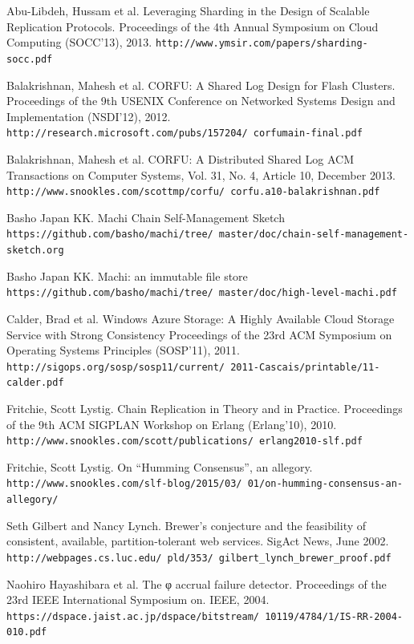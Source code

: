 \documentclass[preprint,10pt]{sigplanconf}
\begin{document}

\begin{thebibliography}{}
\softraggedright

Abu-Libdeh, Hussam et al.
Leveraging Sharding in the Design of Scalable Replication Protocols.
Proceedings of the 4th Annual Symposium on Cloud Computing (SOCC'13), 2013.
{\tt http://www.ymsir.com/papers/sharding-socc.pdf}

Balakrishnan, Mahesh et al.
CORFU: A Shared Log Design for Flash Clusters.
Proceedings of the 9th USENIX Conference on Networked Systems Design
and Implementation (NSDI'12), 2012.
{\tt http://research.microsoft.com/pubs/157204/ corfumain-final.pdf}

Balakrishnan, Mahesh et al.
CORFU: A Distributed Shared Log
ACM Transactions on Computer Systems, Vol. 31, No. 4, Article 10, December 2013.
{\tt http://www.snookles.com/scottmp/corfu/ corfu.a10-balakrishnan.pdf}

Basho Japan KK.
Machi Chain Self-Management Sketch
{\tt https://github.com/basho/machi/tree/ master/doc/chain-self-management-sketch.org}

Basho Japan KK.
Machi: an immutable file store
{\tt https://github.com/basho/machi/tree/ master/doc/high-level-machi.pdf}

Calder, Brad et al.
Windows Azure Storage: A Highly Available Cloud Storage Service with Strong Consistency
Proceedings of the 23rd ACM Symposium on Operating Systems Principles (SOSP'11), 2011.
{\tt http://sigops.org/sosp/sosp11/current/ 2011-Cascais/printable/11-calder.pdf}

Fritchie, Scott Lystig.
Chain Replication in Theory and in Practice.
Proceedings of the 9th ACM SIGPLAN Workshop on Erlang (Erlang'10), 2010.
{\tt http://www.snookles.com/scott/publications/ erlang2010-slf.pdf}

Fritchie, Scott Lystig.
On “Humming Consensus”, an allegory.
{\tt http://www.snookles.com/slf-blog/2015/03/ 01/on-humming-consensus-an-allegory/}

Seth Gilbert and Nancy Lynch.
Brewer’s conjecture and the feasibility of consistent, available, partition-tolerant web services.
SigAct News, June 2002.
{\tt http://webpages.cs.luc.edu/~pld/353/ gilbert\_lynch\_brewer\_proof.pdf}

Naohiro Hayashibara et al.
The φ accrual failure detector.
Proceedings of the 23rd IEEE International Symposium on. IEEE, 2004.
{\tt https://dspace.jaist.ac.jp/dspace/bitstream/ 10119/4784/1/IS-RR-2004-010.pdf}


\end{thebibliography}
\end{document}
